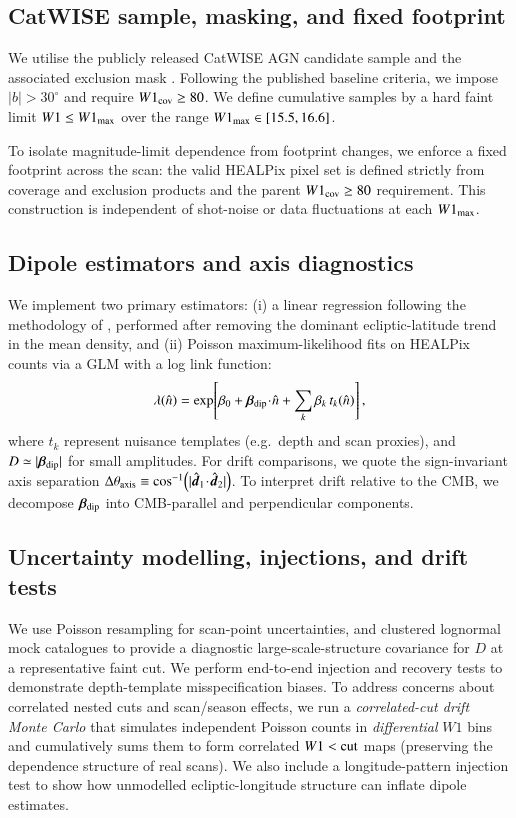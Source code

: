 \documentclass[fleqn,usenatbib]{mnras}
\begin{document}
\subsection{CatWISE sample, masking, and fixed footprint}
We utilise the publicly released CatWISE AGN candidate sample and the associated exclusion mask \citep{catwise2020,secrest2022}.
Following the published baseline criteria, we impose $|b|>30^\circ$ and require $W1_{\rm cov}\ge 80$.
We define cumulative samples by a hard faint limit $W1 \le W1_{\rm max}$ over the range $W1_{\rm max}\in[15.5,16.6]$.

To isolate magnitude-limit dependence from footprint changes, we enforce a fixed footprint across the scan: the valid HEALPix pixel set is defined strictly from coverage and exclusion products and the parent $W1_{\rm cov}\ge 80$ requirement.
This construction is independent of shot-noise or data fluctuations at each $W1_{\rm max}$.

\subsection{Dipole estimators and axis diagnostics}
We implement two primary estimators: (i) a linear regression following the methodology of \citet{secrest2022}, performed after removing the dominant ecliptic-latitude trend in the mean density, and (ii) Poisson maximum-likelihood fits on HEALPix counts via a GLM with a log link function:
\begin{equation}
\lambda(\hat n)=\exp\!\left[\beta_0+\bm{\beta}_{\rm dip}\!\cdot\!\hat n+\sum_{k}\beta_k\,t_k(\hat n)\right],
\end{equation}
where $t_k$ represent nuisance templates (e.g.\ depth and scan proxies), and $D\simeq|\bm{\beta}_{\rm dip}|$ for small amplitudes.
For drift comparisons, we quote the sign-invariant axis separation
$\Delta\theta_{\rm axis}\equiv\cos^{-1}\!\left(|\hat{\bm d}_1\!\cdot\!\hat{\bm d}_2|\right)$.
To interpret drift relative to the CMB, we decompose $\bm{\beta}_{\rm dip}$ into CMB-parallel and perpendicular components.

\subsection{Uncertainty modelling, injections, and drift tests}
We use Poisson resampling for scan-point uncertainties, and clustered lognormal mock catalogues to provide a diagnostic large-scale-structure covariance for $D$ at a representative faint cut.
We perform end-to-end injection and recovery tests to demonstrate depth-template misspecification biases.
To address concerns about correlated nested cuts and scan/season effects, we run a \emph{correlated-cut drift Monte Carlo} that simulates independent Poisson counts in \emph{differential} $W1$ bins and cumulatively sums them to form correlated $W1<{\rm cut}$ maps (preserving the dependence structure of real scans).
We also include a longitude-pattern injection test to show how unmodelled ecliptic-longitude structure can inflate dipole estimates.
\end{document}
